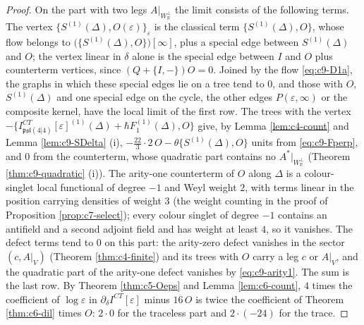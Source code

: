 \begin{proof}
On the part with two legs $A|_{W_{\mathbb R}^\perp}$ the limit consists of the following terms. The vertex $\{S^{(1)}(\Delta),O(\varepsilon)\}_\varepsilon$ is the classical term $\{S^{(1)}(\Delta),O\}$, whose flow belongs to $\big(\{S^{(1)}(\Delta),O\}\big)[\infty]$, plus a special edge between $S^{(1)}(\Delta)$ and $O$; the vertex linear in $\delta$ alone is the special edge between $I$ and $O$ plus counterterm vertices, since $(Q+\{I,-\})O=0$. Joined by the flow \eqref{eq:c9-D1a}, the graphs in which these special edges lie on a tree tend to $0$, and those with $O$, $S^{(1)}(\Delta)$ and one special edge on the cycle, the other edges $P(\varepsilon,\infty)$ or the composite kernel, have the local limit of the first row. The trees with the vertex $-\{I^{CT}_{\mathfrak{psl}(4|4)}[\varepsilon]^{(1)}(\Delta)+\hbar F_1^{(1)}(\Delta),O\}$ give, by Lemma \ref{lem:c4-count} and Lemma \ref{lem:c9-SDelta} (i), $-\tfrac{22}3\cdot2\,O-\theta\{S^{(1)}(\Delta),O\}$ units from \eqref{eq:c9-Fperp}, and $0$ from the counterterm, whose quadratic part contains no $A^*|_{W_{\mathbb R}^\perp}$ (Theorem \ref{thm:c9-quadratic} (i)). The arity-one counterterm of $O$ along $\Delta$ is a colour-singlet local functional of degree $-1$ and Weyl weight $2$, with terms linear in the position carrying densities of weight $3$ (the weight counting in the proof of Proposition \ref{prop:c7-select}); every colour singlet of degree $-1$ contains an antifield and a second adjoint field and has weight at least $4$, so it vanishes. The defect terms tend to $0$ on this part: the arity-zero defect vanishes in the sector $(c,A|_V)$ (Theorem \ref{thm:c4-finite}) and its trees with $O$ carry a leg $c$ or $A|_V$, and the quadratic part of the arity-one defect vanishes by \eqref{eq:c9-arity1}. The sum is the last row. By Theorem \ref{thm:c5-Oeps} and Lemma \ref{lem:c6-count}, $4$ times the coefficient of $\log\varepsilon$ in $\partial_\delta I^{CT}[\varepsilon]$ minus $16\,O$ is twice the coefficient of Theorem \ref{thm:c6-dil} times $O$: $2\cdot0$ for the traceless part and $2\cdot(-24)$ for the trace.
\end{proof}

